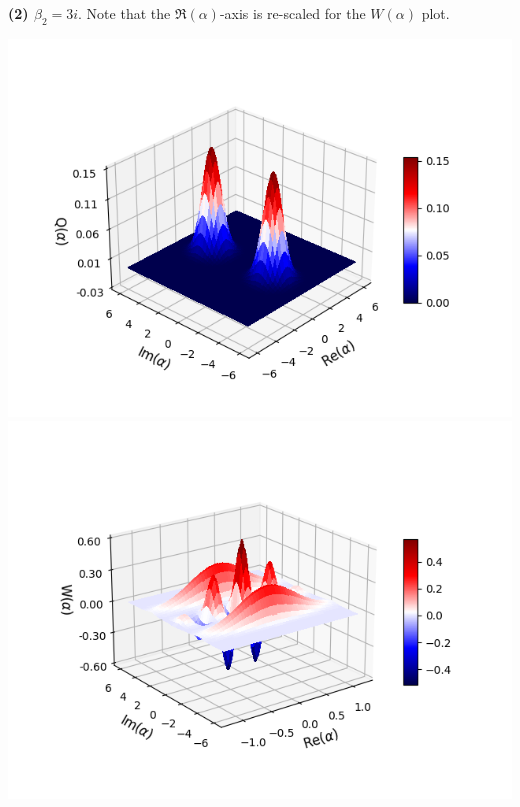 \documentclass[11pt, oneside]{book}
\theoremstyle{break}
\theoremstyle{break}
\begin{document}
\textbf{(2) $\beta_2 = 3i$}. Note that the $\Re(\alpha)$-axis is re-scaled for the $W(\alpha)$ plot. 
\begin{center}
\includegraphics[scale=0.8]{542HW4/b2Q}
\includegraphics[scale=0.8]{542HW4/b2W}
\end{center}
\newpage
\end{document}
